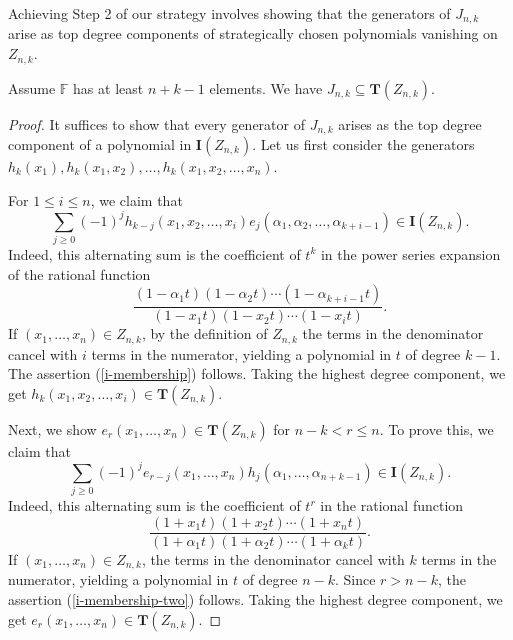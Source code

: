 \documentclass[ALCO,ThmDefs,published]{cedram}
\newcommand{\FF}{{\mathbb{F}}}
\theoremstyle{plain}
\newcommand{\FF}{{\mathbb{F}}}
\newcommand{\II}{{\mathbf {I}}}
\newcommand{\TT}{{\mathbf {T}}}
\begin{document}
Achieving Step 2 of our strategy involves showing that the generators of $J_{n,k}$ arise as 
top degree components of strategically chosen polynomials vanishing on $Z_{n,k}$.

\begin{lemma}
\label{j-contained-in-t}
Assume $\FF$ has at least $n+k-1$ elements.  We have $J_{n,k} \subseteq \TT(Z_{n,k})$.
\end{lemma}

\begin{proof}
It suffices to show that every generator of $J_{n,k}$ arises as the top degree component of a polynomial
in $\II(Z_{n,k})$.  Let us first consider the generators $h_k(x_1), h_k(x_1, x_2), \dots, h_k(x_1, x_2, \dots, x_n)$.

For $1 \leq i \leq n$, we claim that
\begin{equation}
\label{i-membership}
\sum_{j \geq 0} (-1)^j h_{k-j}(x_1, x_2, \dots, x_i) e_j(\alpha_1, \alpha_2, \dots, \alpha_{k+i-1}) \in \II(Z_{n,k}).
\end{equation}
Indeed, this alternating sum is the coefficient of $t^k$ in the power series expansion of the rational function
\begin{equation}
\frac{(1-\alpha_1 t)(1 - \alpha_2 t) \cdots (1 - \alpha_{k+i-1} t)}{(1 - x_1 t) (1 - x_2 t) \cdots (1 - x_i t)}.
\end{equation}
If $(x_1, \dots, x_n) \in Z_{n,k}$, by the definition of $Z_{n,k}$ the
 terms in the denominator cancel with $i$ terms in the numerator, yielding a polynomial
in $t$ of degree $k-1$.  
The assertion (\ref{i-membership}) follows.
Taking the highest degree component, we get
$h_k(x_1, x_2, \dots, x_i) \in \TT(Z_{n,k})$.

Next, we show $e_r(x_1, \dots, x_n) \in \TT(Z_{n,k})$ for $n-k < r \leq n$.  To prove this, we claim that
\begin{equation}
\label{i-membership-two}
\sum_{j \geq 0} (-1)^j e_{r-j}(x_1, \dots, x_n) h_j(\alpha_1, \dots, \alpha_{n+k-1}) \in \II(Z_{n,k}).
\end{equation}
Indeed, this alternating sum is the coefficient of $t^r$ in the rational function
\begin{equation}
\frac{(1 + x_1 t) (1 + x_2 t) \cdots (1 + x_n t)}{(1 + \alpha_1 t) (1 + \alpha_2 t) \cdots (1 + \alpha_k t)}.
\end{equation}
If $(x_1, \dots, x_n) \in Z_{n,k}$, the terms in the denominator cancel with $k$ terms in the numerator, yielding a polynomial
in $t$ of degree $n-k$.  Since $r > n-k$, the assertion (\ref{i-membership-two}) follows.
Taking the highest degree component, we get
$e_r(x_1, \dots, x_n) \in \TT(Z_{n,k})$.
\end{proof}
\end{document}
